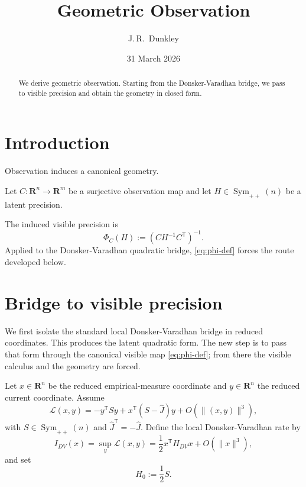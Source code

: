 \documentclass[11pt,a4paper]{article}
\title{\textbf{Geometric Observation}}
\author{J.\,R.~Dunkley}
\date{31 March 2026}
\numberwithin{equation}{section}
\DeclareMathOperator{\Sym}{Sym}
\newcommand{\R}{\mathbf R}
\theoremstyle{thmcompact}
\theoremstyle{remark}
\begin{document}
\maketitle

\begin{abstract}
We derive geometric observation. Starting from the Donsker-Varadhan bridge, we pass to visible precision and obtain the geometry in closed form.
\end{abstract}

\section{Introduction}

Observation induces a canonical geometry.

Let $C:\R^n\to\R^m$ be a surjective observation map and let $H\in\Sym_{++}(n)$ be a latent precision.

The induced visible precision is
\begin{equation}
\Phi_C(H):=(CH^{-1}C^{\mathsf T})^{-1}.
\label{eq:phi-def}
\end{equation}
Applied to the Donsker-Varadhan quadratic bridge, \eqref{eq:phi-def} forces the route developed below.

\section{Bridge to visible precision}
\label{sec:route}

We first isolate the standard local Donsker-Varadhan bridge in reduced coordinates. This produces the latent quadratic form. The new step is to pass that form through the canonical visible map \eqref{eq:phi-def}; from there the visible calculus and the geometry are forced.

Let $x\in\R^n$ be the reduced empirical-measure coordinate and $y\in\R^n$ the reduced current coordinate. Assume
\begin{equation}
\mathcal L(x,y)
=
-y^{\mathsf T}Sy+x^{\mathsf T}(S-\widehat J)y+O(\|(x,y)\|^3),
\label{eq:reduced-envelope}
\end{equation}
with $S\in\Sym_{++}(n)$ and $\widehat J^{\mathsf T}=-\widehat J$. Define the local Donsker-Varadhan rate by
\begin{equation}
I_{DV}(x)=\sup_y \mathcal L(x,y)=\frac12 x^{\mathsf T}H_{DV}x+O(\|x\|^3),
\label{eq:dv-rate}
\end{equation}
and set
\begin{equation}
H_0:=\frac12 S.
\label{eq:H0-def}
\end{equation}
\end{document}
